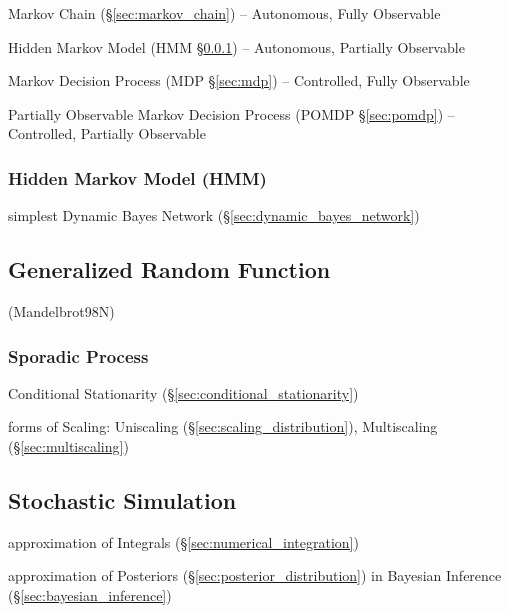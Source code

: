 Markov Chain (\S\ref{sec:markov_chain}) -- Autonomous, Fully Observable

Hidden Markov Model (HMM \S\ref{sec:hmm}) -- Autonomous, Partially Observable

Markov Decision Process (MDP \S\ref{sec:mdp}) -- Controlled, Fully Observable

Partially Observable Markov Decision Process (POMDP \S\ref{sec:pomdp}) --
Controlled, Partially Observable



\subsubsection{Hidden Markov Model (HMM)}\label{sec:hmm}

simplest Dynamic Bayes Network (\S\ref{sec:dynamic_bayes_network})



\subsection{Generalized Random Function}\label{sec:generalized_random}

(Mandelbrot98N)



\subsubsection{Sporadic Process}\label{sec:sporadic_process}

Conditional Stationarity (\S\ref{sec:conditional_stationarity})

forms of Scaling: Uniscaling (\S\ref{sec:scaling_distribution}), Multiscaling
(\S\ref{sec:multiscaling})



\subsection{Stochastic Simulation}\label{sec:stochastic_simulation}

approximation of Integrals (\S\ref{sec:numerical_integration})

approximation of Posteriors (\S\ref{sec:posterior_distribution}) in Bayesian
Inference (\S\ref{sec:bayesian_inference})

